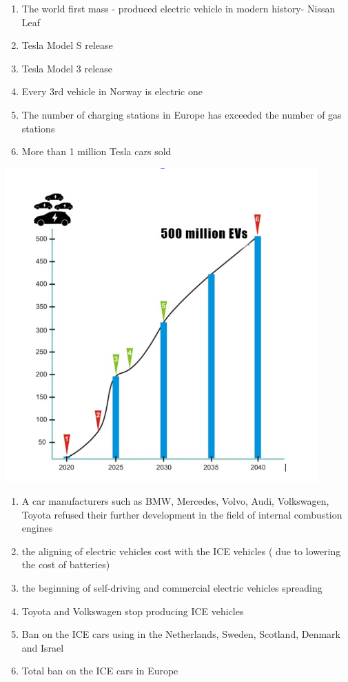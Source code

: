 \documentclass[a4paper,12pt]{report}
\begin{document}
\begin{enumerate}
	\item The  world first mass - produced electric vehicle  in modern history- Nissan Leaf
	\item Tesla Model S release
	\item Tesla Model 3 release
	\item Every 3rd vehicle  in Norway is electric one
	\item The number of charging stations in Europe has exceeded the number of gas stations
	\item More than 1 million Tesla cars sold
\end{enumerate}



\vspace*{1cm}
\includegraphics[width=12cm]{chart2en}
\vspace*{1cm}

\begin{enumerate}
	\item A car manufacturers such as BMW, Mercedes, Volvo, Audi, Volkswagen, Toyota  refused their  further development in the field of internal combustion engines
	\item the aligning  of  electric vehicles cost  with the ICE vehicles ( due to lowering the cost of batteries)
	\item the beginning of self-driving  and  commercial electric vehicles spreading
	\item Toyota and Volkswagen stop producing  ICE  vehicles
	\item Ban on the ICE cars using in the Netherlands, Sweden, Scotland, Denmark and Israel
	\item Total ban on the  ICE  cars in Europe
\end{enumerate}
\end{document}
